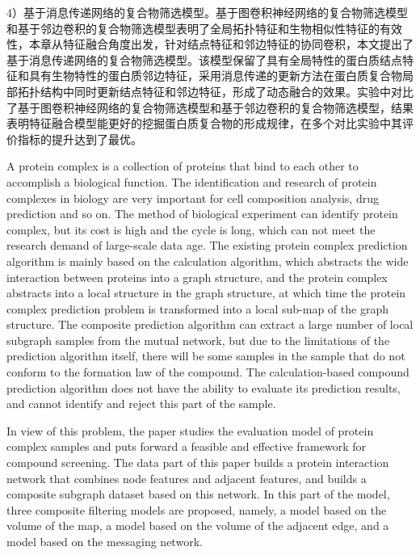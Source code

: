\begin{cabstract}
  4）基于消息传递网络的复合物筛选模型。基于图卷积神经网络的复合物筛选模型和基于邻边卷积的复合物筛选模型表明了全局拓扑特征和生物相似性特征的有效性，本章从特征融合角度出发，针对结点特征和邻边特征的协同卷积，本文提出了基于消息传递网络的复合物筛选模型。该模型保留了具有全局特性的蛋白质结点特征和具有生物特性的蛋白质邻边特征，采用消息传递的更新方法在蛋白质复合物局部拓扑结构中同时更新结点特征和邻边特征，形成了动态融合的效果。实验中对比了基于图卷积神经网络的复合物筛选模型和基于邻边卷积的复合物筛选模型，结果表明特征融合模型能更好的挖掘蛋白质复合物的形成规律，在多个对比实验中其评价指标的提升达到了最优。

\end{cabstract}


\begin{eabstract}
  A protein complex is a collection of proteins that bind to each other to accomplish a biological function. The identification and research of protein complexes in biology are very important for cell composition analysis, drug prediction and so on. The method of biological experiment can identify protein complex, but its cost is high and the cycle is long, which can not meet the research demand of large-scale data age.
  The existing protein complex prediction algorithm is mainly based on the calculation algorithm, which abstracts the wide interaction between proteins into a graph structure, and the protein complex abstracts into a local structure in the graph structure, at which time the protein complex prediction problem is transformed into a local sub-map of the graph structure. The composite prediction algorithm can extract a large number of local subgraph samples from the mutual network, but due to the limitations of the prediction algorithm itself, there will be some samples in the sample that do not conform to the formation law of the compound. The calculation-based compound prediction algorithm does not have the ability to evaluate its prediction results, and cannot identify and reject this part of the sample.

  In view of this problem, the paper studies the evaluation model of protein complex samples and puts forward a feasible and effective framework for compound screening. The data part of this paper builds a protein interaction network that combines node features and adjacent features, and builds a composite subgraph dataset based on this network. In this part of the model, three composite filtering models are proposed, namely, a model based on the volume of the map, a model based on the volume of the adjacent edge, and a model based on the messaging network.


\end{eabstract}
